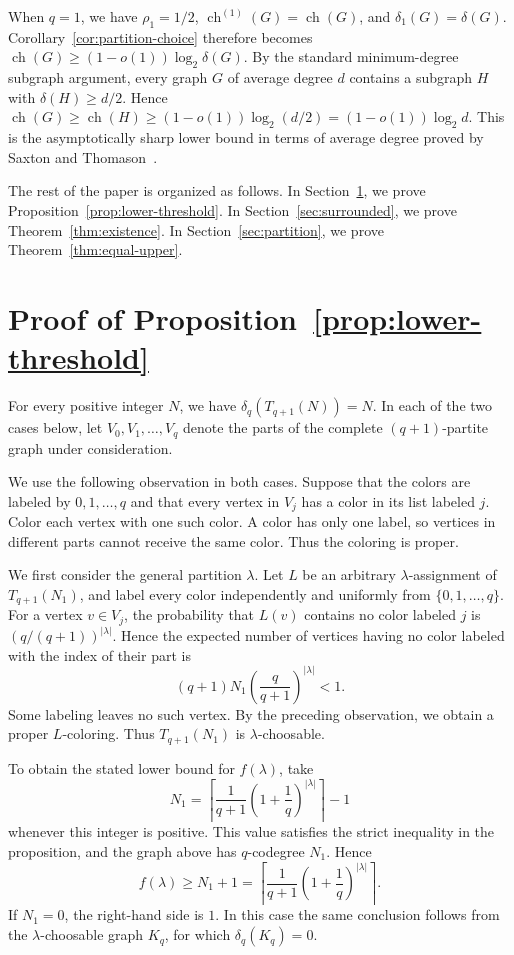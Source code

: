 \documentclass[10pt,a4paper]{amsart}
\numberwithin{equation}{section}
\begin{document}
When $q=1$, we have $\rho_1=1/2$,
$\operatorname{ch}^{(1)}(G)=\operatorname{ch}(G)$, and
$\delta_1(G)=\delta(G)$. Corollary~\ref{cor:partition-choice} therefore
becomes $\operatorname{ch}(G)\geq(1-o(1))\log_2\delta(G)$. By the standard
minimum-degree subgraph argument, every graph $G$ of average degree $d$
contains a subgraph $H$ with $\delta(H)\geq d/2$. Hence
$\operatorname{ch}(G)\geq\operatorname{ch}(H)
\geq(1-o(1))\log_2(d/2)=(1-o(1))\log_2d$. This is the asymptotically sharp
lower bound in terms of average degree proved by Saxton and
Thomason~\cite{ST2015}.

The rest of the paper is organized as follows. In
Section~\ref{sec:complete-multipartite}, we prove
Proposition~\ref{prop:lower-threshold}. In Section~\ref{sec:surrounded}, we
prove Theorem~\ref{thm:existence}.
In Section~\ref{sec:partition}, we prove Theorem~\ref{thm:equal-upper}.
 
\section{Proof of Proposition~\ref{prop:lower-threshold}}
\label{sec:complete-multipartite}
 
For every positive integer $N$, we have $\delta_q(T_{q+1}(N))=N$.
In each of the two cases below, let $V_0,V_1,\ldots,V_q$ denote the parts of
the complete $(q+1)$-partite graph under consideration.

We use the following observation in both cases. Suppose that the colors are
labeled by $0,1,\ldots,q$ and that every vertex in $V_j$ has a color in its
list labeled $j$. Color each vertex with one such color. A color has only one
label, so vertices in different parts cannot receive the same color. Thus the
coloring is proper.

We first consider the general partition $\lambda$. Let $L$ be an arbitrary
$\lambda$-assignment of $T_{q+1}(N_1)$, and label every color independently
and uniformly from $\{0,1,\ldots,q\}$. For a vertex $v\in V_j$, the
probability that $L(v)$ contains no color labeled $j$ is
$(q/(q+1))^{|\lambda|}$.
Hence the expected number of vertices having no color labeled with the index
of their part is
\[
 (q+1)N_1\left(\frac{q}{q+1}\right)^{|\lambda|}<1.
\]
Some labeling leaves no such vertex. By the preceding observation, we obtain
a proper $L$-coloring. Thus $T_{q+1}(N_1)$ is $\lambda$-choosable.

To obtain the stated lower bound for $f(\lambda)$, take
\[
 N_1=
 \left\lceil
 \frac{1}{q+1}\left(1+\frac1q\right)^{|\lambda|}
 \right\rceil-1
\]
whenever this integer is positive. This value satisfies the strict inequality
in the proposition, and the graph above has $q$-codegree $N_1$. Hence
\[
 f(\lambda)\geq N_1+1
 =\left\lceil
 \frac{1}{q+1}\left(1+\frac1q\right)^{|\lambda|}
 \right\rceil.
\]
If $N_1=0$, the right-hand side is $1$. In this case the same conclusion
follows from the $\lambda$-choosable graph $K_q$, for which
$\delta_q(K_q)=0$.
\end{document}
